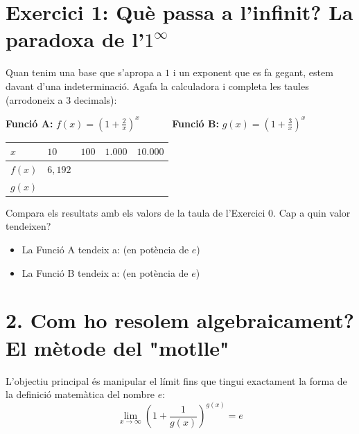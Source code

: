 \documentclass[12pt,a4paper]{article}
\begin{document}
\vspace{0.8cm}

\section*{Exercici 1: Què passa a l'infinit? La paradoxa de l'$1^\infty$}

Quan tenim una base que s'apropa a $1$ i un exponent que es fa gegant, estem davant d'una indeterminació. Agafa la calculadora i completa les taules (arrodoneix a 3 decimals):

\vspace{0.3cm}
\textbf{Funció A:} $\displaystyle f(x) = \left(1 + \frac{2}{x}\right)^x \quad \quad \quad$ \textbf{Funció B:} $\displaystyle g(x) = \left(1 + \frac{3}{x}\right)^x$

\vspace{0.3cm}
\renewcommand{\arraystretch}{1.5}
\begin{tabularx}{\textwidth}{|l|X|X|X|X|}
    \hline
    $x$ & $10$ & $100$ & $1.000$ & $10.000$ \\ \hline
    $f(x)$ & $6,192$ & & & \\ \hline
    $g(x)$ & & & & \\ \hline
\end{tabularx}

\vspace{0.4cm}
Compara els resultats amb els valors de la taula de l'Exercici 0. Cap a quin valor tendeixen?
\begin{itemize}
    \item La Funció A tendeix a: \underline{\hspace{3cm}} (en potència de $e$)
    \item La Funció B tendeix a: \underline{\hspace{3cm}} (en potència de $e$)
\end{itemize}

\vspace{0.8cm}

\section*{2. Com ho resolem algebraicament? El mètode del "motlle"}

L'objectiu principal és manipular el límit fins que tingui exactament la forma de la definició matemàtica del nombre $e$:
\[ \lim_{x \to \infty} \left( 1 + \frac{1}{g(x)} \right)^{g(x)} = e \]
\end{document}
